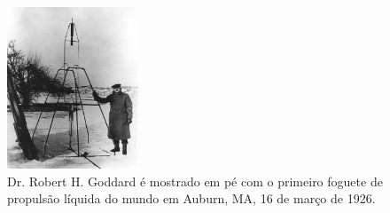 


\begin{figure}[ht]
    \centering
    \caption{Dr. Robert H. Goddard é mostrado em pé com o primeiro foguete de propulsão líquida do mundo em Auburn, MA, 16 de março de 1926.}
    \begin{center}
        \includegraphics[width=0.35\textwidth]{img/primeirofoguete.jpg}
    \end{center}
    \vspace{-0.5cm}
   \label{fig:Primeiro-foguete}
\end{figure}